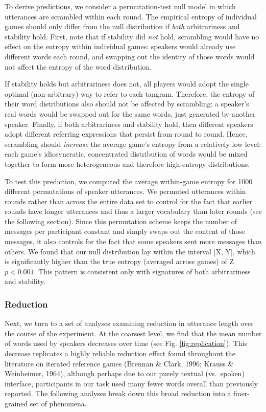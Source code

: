 \documentclass[alpha-refs]{wiley-article}
\begin{document}
To derive predictions, we consider a permutation-test null model in
which utterances are scrambled within each round. The empirical entropy
of individual games should only differ from the null distribution if
\emph{both} arbitrariness and stability hold. First, note that if
stability did \emph{not} hold, scrambling would have no effect on the
entropy within individual games: speakers would already use different
words each round, and swapping out the identity of those words would not
affect the entropy of the word distribution.

If stability holds but arbitrariness does not, all players would adopt
the single optimal (non-arbitrary) way to refer to each tangram.
Therefore, the entropy of their word distributions also should not be
affected by scrambling: a speaker's real words would be swapped out for
the same words, just generated by another speaker. Finally, if both
arbitrariness and stability hold, then different speakers adopt
different referring expressions that persist from round to round. Hence,
scrambling should \emph{increase} the average game's entropy from a
relatively low level: each game's idiosyncratic, concentrated
distribution of words would be mixed together to form more heterogeneous
and therefore high-entropy distributions.

To test this prediction, we computed the average within-game entropy for
1000 different permutations of speaker utterances. We permuted
utterances within rounds rather than across the entire data set to
control for the fact that earlier rounds have longer utterances and thus
a larger vocabulary than later rounds (see the following section). Since
this permutation scheme keeps the number of messages per participant
constant and simply swaps out the content of those messages, it also
controls for the fact that some speakers sent more messages than others.
We found that our null distribution lay within the interval {[}X, Y{]},
which is significantly higher than the true entropy (averaged across
games) of Z \(p < 0.001\). This pattern is consistent only with
signatures of both arbitrariness and stability.

\subsubsection{Reduction}\label{reduction}

Next, we turn to a set of analyses examining reduction in utterance
length over the course of the experiment. At the coarsest level, we find
that the mean number of words used by speakers decreases over time (see
Fig. \ref{fig:replication}). This decrease replicates a highly reliable
reduction effect found throughout the literature on iterated reference
games (Brennan \& Clark, 1996; Krauss \& Weinheimer, 1964), although
perhaps due to our purely textual (vs.~spoken) interface, participants
in our task used many fewer words overall than previously reported. The
following analyses break down this broad reduction into a finer-grained
set of phenomena.
\end{document}
